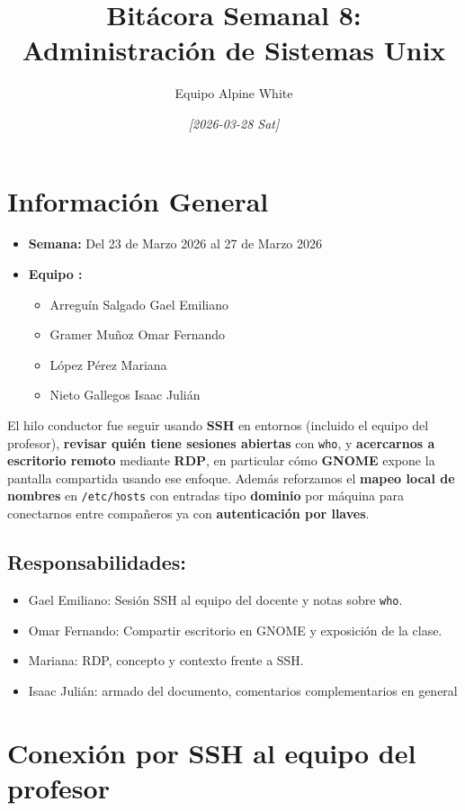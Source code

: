 \documentclass[11pt, letterpaper]{article}
\author{Equipo Alpine White}
\date{\textit{{[}2026-03-28 Sat]}}
\title{Bitácora Semanal 8: Administración de Sistemas Unix}
\begin{document}
\maketitle
\setcounter{tocdepth}{2}
\tableofcontents

\section{Información General}
\label{sec:org8f46890}
\begin{itemize}
\item \textbf{Semana:} Del 23 de Marzo 2026 al 27 de Marzo 2026
\item \textbf{Equipo :}
\begin{itemize}
\item Arreguín Salgado Gael Emiliano
\item Gramer Muñoz Omar Fernando
\item López Pérez Mariana
\item Nieto Gallegos Isaac Julián
\end{itemize}
\end{itemize}

El hilo conductor fue seguir usando \textbf{SSH} en entornos (incluido el equipo del profesor), \textbf{revisar quién tiene sesiones abiertas} con \texttt{who}, y \textbf{acercarnos a escritorio remoto} mediante \textbf{RDP}, en particular cómo \textbf{GNOME} expone la pantalla compartida usando ese enfoque. Además reforzamos el \textbf{mapeo local de nombres} en \texttt{/etc/hosts} con entradas tipo \textbf{dominio} por máquina para conectarnos entre compañeros ya con \textbf{autenticación por llaves}.
\subsection{Responsabilidades:}
\label{sec:org1aaa7e8}
\begin{itemize}
\item Gael Emiliano: Sesión SSH al equipo del docente y notas sobre \texttt{who}.
\item Omar Fernando: Compartir escritorio en GNOME y exposición de la clase.
\item Mariana: RDP, concepto y contexto frente a SSH.
\item Isaac Julián: armado del documento, comentarios complementarios en general
\end{itemize}
\section{Conexión por SSH al equipo del profesor}
\label{sec:org69f08cd}
\end{document}
